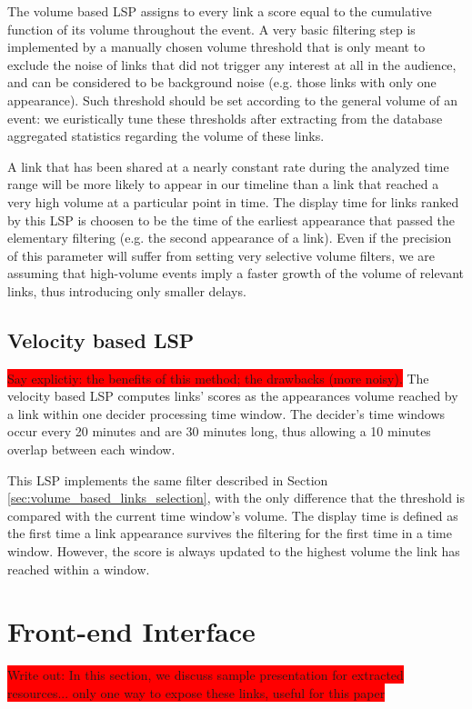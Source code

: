 \documentclass{sig-alternate}
\newcommand{\todo}[1]{\colorbox{red}{#1}}
\begin{document}
The volume based LSP assigns to every link a score equal to the cumulative function of its volume throughout the event. A very basic filtering step is implemented by a manually chosen volume threshold that is only meant to exclude the noise of links that did not trigger any interest at all in the audience, and can be considered to be background noise (e.g. those links with only one appearance). Such threshold should be set according to the general volume of an event: we euristically tune these thresholds after extracting from the database aggregated statistics regarding the volume of these links. 

A link that has been shared at a nearly constant rate during the analyzed time range will be more likely to appear in our timeline than a link that reached a very high volume at a particular point in time. The display time for links ranked by this LSP is choosen to be the time of the earliest appearance that passed the elementary filtering (e.g. the second appearance of a link). Even if the precision of this parameter will suffer from setting very selective volume filters, we are assuming that high-volume events imply a faster growth of the volume of relevant links, thus introducing only smaller delays.

\subsection{Velocity based LSP}
\label{sec:velocity_based_links_selection}
\todo{Say explictiy: the benefits of this method; the drawbacks (more noisy).}
The velocity based LSP computes links' scores as the appearances volume reached by a link within one decider processing time window. The decider's time windows occur every 20 minutes and are 30 minutes long, thus allowing a 10 minutes overlap between each window.

This LSP implements the same filter described in Section \ref{sec:volume_based_links_selection}, with the only difference that the threshold is compared with the current time window's volume. The display time is defined as the first time a link appearance survives the filtering for the first time in a time window. However, the score is always updated to the highest volume the link has reached within a window.

\section{Front-end Interface}
\todo{Write out: In this section, we discuss sample presentation for extracted resources... only one way to expose these links, useful for this paper}
\end{document}
